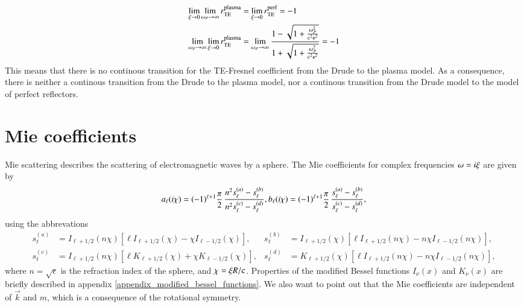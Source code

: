 \begin{align}
\lim_{\xi\to 0} \lim_{\omega_P\to\infty} r_{\mathrm{TE}}^\text{plasma} &= \lim_{\xi\to 0} r_{\mathrm{TE}}^\text{perf} = -1 \\
\lim_{\omega_P\to\infty} \lim_{\xi\to 0} r_{\mathrm{TE}}^\text{plasma} &= \lim_{\omega_P\to\infty} \frac{1-\sqrt{1+\frac{\omega_P^2}{\mathrm{c}^2\kappa^2}}}{1+\sqrt{1+\frac{\omega_P^2}{\mathrm{c}^2\kappa^2}}} = -1
\end{align}
This means that there is no continous transition for the TE-Fresnel coefficient
from the Drude to the plasma model. As a consequence, there is neither a
continous transition from the Drude to the plasma model, nor a continous
transition from the Drude model to the model of perfect reflectors.


\section{Mie coefficients}

Mie scattering describes the scattering of electromagnetic waves by a sphere.
The Mie coefficients for complex frequencies $\omega=i\xi$ are given by
\cite{bohrenhuffman, Durand, PhysRevA.83.039905}
\begin{equation}
a_\ell(i\chi) = (-1)^{\ell+1} \frac{\pi}{2} \, \frac{n^2 s_\ell^{(a)}-s_\ell^{(b)}}{n^2 s_\ell^{(c)}-s_\ell^{(d)}}, \\
b_\ell(i\chi) = (-1)^{\ell+1} \frac{\pi}{2} \, \frac{s_\ell^{(a)}-s_\ell^{(b)}}{s_\ell^{(c)}-s_\ell^{(d)}},
\end{equation}
using the abbrevations
\begin{align}
\nonumber
s_\ell^{(a)} &= I_{\ell+1/2} (n\chi) \left[ \ell I_{\ell+1/2}( \chi)- \chi I_{\ell-1/2}( \chi) \right],
&s_\ell^{(b)} &= I_{\ell+1/2}( \chi) \left[ \ell I_{\ell+1/2}(n\chi)-n\chi I_{\ell-1/2}(n\chi) \right], \\
s_\ell^{(c)} &= I_{\ell+1/2} (n\chi) \left[ \ell K_{\ell+1/2}( \chi)+ \chi K_{\ell-1/2}( \chi) \right],
&s_\ell^{(d)} &= K_{\ell+1/2}( \chi) \left[ \ell I_{\ell+1/2}(n\chi)-n\chi I_{\ell-1/2}(n\chi) \right],
\end{align}
where $n=\sqrt{\epsilon}$ is the refraction index of the sphere, and $\chi =
\xi R/\mathrm{c}$. Properties of the modified Bessel functions $I_\nu(x)$ and
$K_\nu(x)$ are briefly described in appendix
\ref{appendix_modified_bessel_functions}. We also want to point out that the
Mie coefficients are independent of $\vec k$ and $m$, which is a consequence of
the rotational symmetry.

